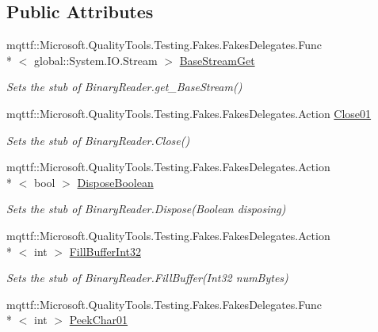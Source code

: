 \subsection*{Public Attributes}
\begin{DoxyCompactItemize}
\item 
mqttf\-::\-Microsoft.\-Quality\-Tools.\-Testing.\-Fakes.\-Fakes\-Delegates.\-Func\\*
$<$ global\-::\-System.\-I\-O.\-Stream $>$ \hyperlink{class_system_1_1_i_o_1_1_fakes_1_1_stub_binary_reader_a1c542231bd673c2d63bae96b22dedaa1}{Base\-Stream\-Get}
\begin{DoxyCompactList}\small\item\em Sets the stub of Binary\-Reader.\-get\-\_\-\-Base\-Stream()\end{DoxyCompactList}\item 
mqttf\-::\-Microsoft.\-Quality\-Tools.\-Testing.\-Fakes.\-Fakes\-Delegates.\-Action \hyperlink{class_system_1_1_i_o_1_1_fakes_1_1_stub_binary_reader_aadf04019d4acb612d2b1a8142c4ffa5a}{Close01}
\begin{DoxyCompactList}\small\item\em Sets the stub of Binary\-Reader.\-Close()\end{DoxyCompactList}\item 
mqttf\-::\-Microsoft.\-Quality\-Tools.\-Testing.\-Fakes.\-Fakes\-Delegates.\-Action\\*
$<$ bool $>$ \hyperlink{class_system_1_1_i_o_1_1_fakes_1_1_stub_binary_reader_afc99be4545dc063862a866310f85a972}{Dispose\-Boolean}
\begin{DoxyCompactList}\small\item\em Sets the stub of Binary\-Reader.\-Dispose(\-Boolean disposing)\end{DoxyCompactList}\item 
mqttf\-::\-Microsoft.\-Quality\-Tools.\-Testing.\-Fakes.\-Fakes\-Delegates.\-Action\\*
$<$ int $>$ \hyperlink{class_system_1_1_i_o_1_1_fakes_1_1_stub_binary_reader_a7e4fe0bf6bd23adf132e8fedb365d9dc}{Fill\-Buffer\-Int32}
\begin{DoxyCompactList}\small\item\em Sets the stub of Binary\-Reader.\-Fill\-Buffer(\-Int32 num\-Bytes)\end{DoxyCompactList}\item 
mqttf\-::\-Microsoft.\-Quality\-Tools.\-Testing.\-Fakes.\-Fakes\-Delegates.\-Func\\*
$<$ int $>$ \hyperlink{class_system_1_1_i_o_1_1_fakes_1_1_stub_binary_reader_a50c102554d88b73672200941a51a26a0}{Peek\-Char01}

\end{DoxyCompactItemize}
